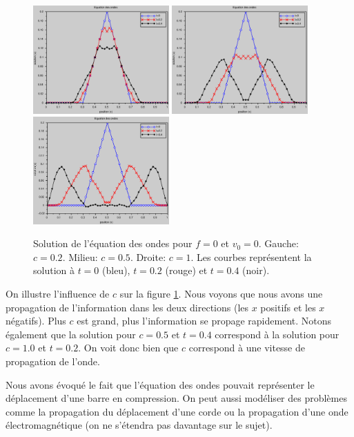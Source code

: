 \documentclass[12pt,a4paper,twoside]{article}
\begin{document}
\begin{figure}[h]
  \centering
  \includegraphics[width = 5.2cm]{Figures/ondes_c0_2.eps}
  \includegraphics[width = 5.2cm]{Figures/ondes_c0_5.eps}
  \includegraphics[width = 5.2cm]{Figures/ondes_c1.eps}
  \caption{Solution de l'\'equation des ondes pour $f=0$ et $v_0 = 0$.
  Gauche: $c = 0.2$. Milieu: $c=0.5$. Droite: $c=1$.
  Les courbes repr\'esentent la solution \`a $t=0$ (bleu),
  $t=0.2$ (rouge) et $t=0.4$ (noir).}
  \label{fig:ondes_c}
\end{figure}


On illustre l'influence de $c$ sur la figure \ref{fig:ondes_c}.
Nous voyons que nous avons une propagation de l'information 
dans les deux directions (les $x$ positifs et les $x$ n\'egatifs).
Plus $c$ est grand, plus l'information se propage rapidement.
Notons \'egalement que la solution pour $c=0.5$ et $t=0.4$
correspond \`a la solution pour $c=1.0$ et $t=0.2$.
On voit donc bien que $c$ correspond \`a une vitesse de propagation
de l'onde.


Nous avons \'evoqu\'e le fait que l'\'equation des ondes
pouvait repr\'esenter le d\'eplacement d'une barre en compression.
On peut aussi mod\'eliser des probl\`emes 
comme la propagation du d\'eplacement d'une corde ou
la propagation d'une onde \'electromagn\'etique
(on ne s'\'etendra pas davantage sur le sujet).
\end{document}
